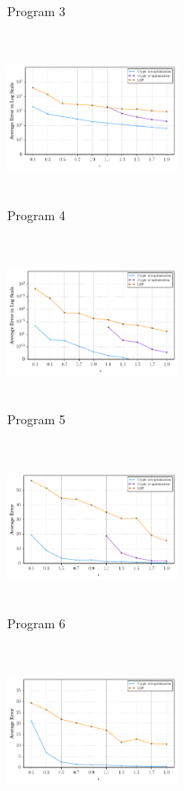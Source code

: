 \begin{figure}
\begin{subfigure}[b]{0.3\textwidth}
        \caption{Program 3}
        \label{fig:mouse}\end{subfigure}
          \begin{subfigure}[b]{0.3\textwidth}
    \qquad    \includegraphics[width=5cm,height=5cm]{test4.pdf}
        \caption{Program 4}
        \label{fig:mouse}\end{subfigure}
          \begin{subfigure}[b]{0.3\textwidth}
    \qquad    \includegraphics[width=5cm,height=5cm]{test55.pdf}
        \caption{Program 5}
        \label{fig:mouse}\end{subfigure}
          \begin{subfigure}[b]{0.3\textwidth}
    \qquad    \includegraphics[width=5cm,height=5cm]{test66.pdf}
        \caption{Program 6}
        \label{fig:mouse}\end{subfigure}
          \begin{subfigure}[b]{0.3\textwidth}
    \qquad    \includegraphics[width=5cm,height=5cm]{test7.pdf}

\end{subfigure}
\end{figure}
